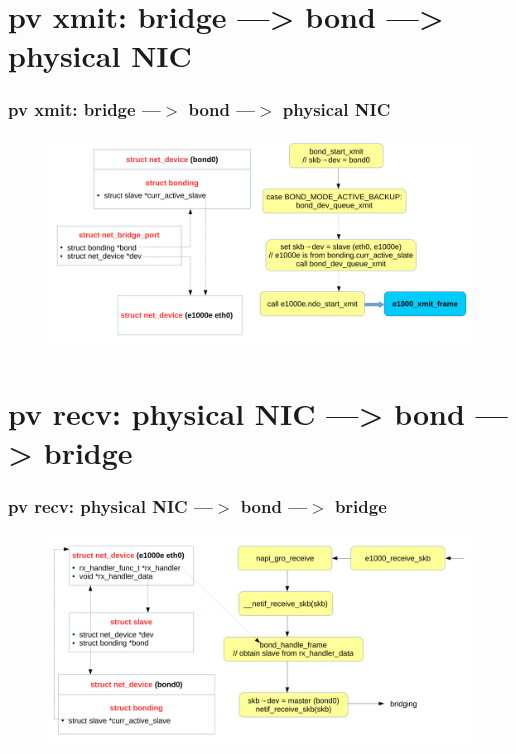 \documentclass[aspectratio=169]{beamer}
\begin{document}

\section{pv xmit: bridge ---> bond ---> physical NIC}
\begin{frame}
\frametitle{pv xmit: bridge ---$>$ bond ---$>$ physical NIC}
\begin{figure}
\includegraphics[width=1.0\linewidth]{figures/bridge_to_bond.pdf}
\end{figure}
\end{frame}


\section{pv recv: physical NIC ---> bond ---> bridge}
\begin{frame}
\frametitle{pv recv: physical NIC ---$>$ bond ---$>$ bridge}
\begin{figure}
\includegraphics[width=1.0\linewidth]{figures/bond_to_bridge.pdf}
\end{figure}
\end{frame}
\end{document}
